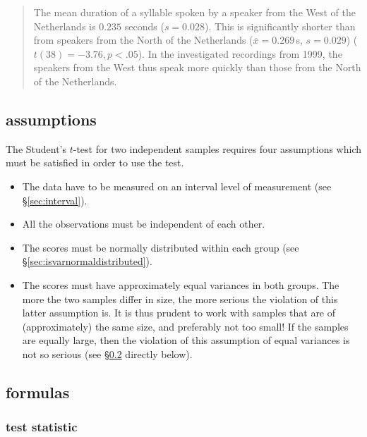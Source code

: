 \documentclass[
]{book}
\begin{document}
\begin{quote}
The mean duration of a syllable spoken by a speaker from the West
of the Netherlands is \(0.235\) seconds (\(s=0.028\)). This is
significantly shorter than from speakers from the North of the Netherlands
(\(\overline{x}=0.269\) s, \(s=0.029\)) (\(t(38)=-3.76, p<.05\)). In the
investigated recordings from 1999, the speakers from the West thus
speak more quickly than those from the North of the Netherlands.
\end{quote}

\hypertarget{sec:ttest-unpaired-assumptions}{%
\subsection{assumptions}\label{sec:ttest-unpaired-assumptions}}

The Student's \(t\)-test for two independent samples requires four assumptions
which must be satisfied in order to use the test.

\begin{itemize}
\item
  The data have to be measured on an interval level of measurement (see
  §\ref{sec:interval}).
\item
  All the observations must be independent of each other.
\item
  The scores must be normally distributed within each group (see
  §\ref{sec:isvarnormaldistributed}).
\item
  The scores must have approximately equal variances in both groups.
  The more the two samples differ in size, the more
  serious the violation of this latter assumption is. It is thus prudent
  to work with samples that are of (approximately) the same size, and preferably not too small! If the samples are equally large, then the violation of this assumption of equal
  variances is not so serious (see §\ref{sec:ttest-formulas} directly below).
\end{itemize}

\hypertarget{sec:ttest-formulas}{%
\subsection{formulas}\label{sec:ttest-formulas}}

\hypertarget{test-statistic}{%
\subsubsection{test statistic}\label{test-statistic}}
\end{document}
